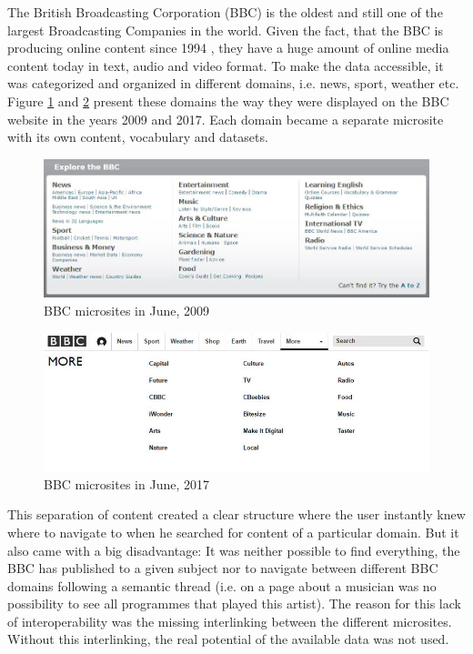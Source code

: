 \documentclass{llncs}
\begin{document}
The British Broadcasting Corporation (BBC) is the oldest and still one of the largest Broadcasting Companies in the world. Given the fact, that the BBC is producing online content since 1994 \cite{st1994}, they have a huge amount of online media content today in text, audio and video format. To make the data accessible, it was categorized and organized in different domains, i.e. news, sport, weather etc. Figure \ref{fig:domains2009} and \ref{fig:domains2017} present these domains the way they were displayed on the BBC website in the years 2009 and 2017. Each domain became a separate microsite with its own content, vocabulary and datasets.
\begin{figure}[!ht]
  \includegraphics[width=\textwidth]{images/bbc_domains_2009}
  \caption{BBC microsites in June, 2009}
  \label{fig:domains2009}
\end{figure}
\begin{figure}[!ht]
  \includegraphics[width=\textwidth]{images/bbc_domains_2017}
  \caption{BBC microsites in June, 2017}
  \label{fig:domains2017}
\end{figure}

This separation of content created a clear structure where the user instantly knew where to navigate to when he searched for content of a particular domain. But it also came with a big disadvantage: It was neither possible to find everything, the BBC has published to a given subject nor to navigate between different BBC domains following a semantic thread (i.e. on a page about a musician was no possibility to see all programmes that played this artist). The reason for this lack of interoperability was the missing interlinking between the different microsites. Without this interlinking, the real potential of the available data was not used.
\end{document}

